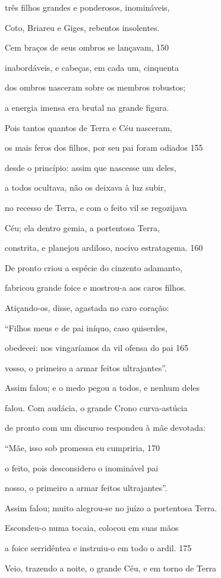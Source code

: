 três filhos grandes e ponderosos, inomináveis,

Coto, Briareu e Giges, rebentos insolentes.

Cem braços de seus ombros se lançavam, \num{150}

inabordáveis, e cabeças, em cada um, cinquenta

dos ombros nasceram sobre os membros robustos;

a energia imensa era brutal na grande figura.

\quad{}Pois tantos quantos de Terra e Céu nasceram,

os mais feros dos filhos, por seu pai foram odiados \num{155}

desde o princípio: assim que nascesse um deles,

a todos ocultava, não os deixava à luz subir,

no recesso de Terra, e com o feito vil se regozijava

Céu; ela dentro gemia, a portentosa Terra,

constrita, e planejou ardiloso, nocivo estratagema. \num{160}

De pronto criou a espécie do cinzento adamanto,

fabricou grande foice e mostrou-a aos caros filhos.

\quad{}Atiçando-os, disse, agastada no caro coração:

``Filhos meus e de pai iníquo, caso quiserdes,

obedecei: nos vingaríamos da vil ofensa do pai \num{165}

vosso, o primeiro a armar feitos ultrajantes''.

\quad{}Assim falou; e o medo pegou a todos, e nenhum deles

falou. Com audácia, o grande Crono curva-astúcia

de pronto com um discurso respondeu à mãe devotada:

``Mãe, isso sob promessa eu cumpriria, \num{170}

o feito, pois desconsidero o inominável pai

nosso, o primeiro a armar feitos ultrajantes''.

\quad{}Assim falou; muito alegrou-se no juízo a portentosa Terra.

Escondeu-o numa tocaia, colocou em suas mãos

a foice serridêntea e instruiu-o em todo o ardil. \num{175}

Veio, trazendo a noite, o grande Céu, e em torno de Terra

